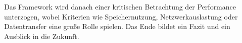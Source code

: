 \noindent
Das Framework wird danach einer kritischen Betrachtung der Performance unterzogen, wobei Kriterien wie Speichernutzung, Netzwerkauslastung oder Datentransfer eine große Rolle spielen. Das Ende bildet ein Fazit und ein Ausblick in die Zukunft. 


